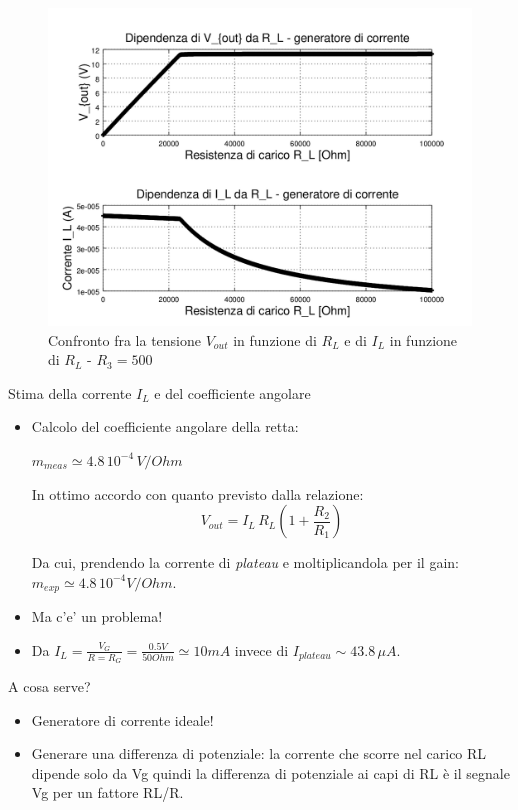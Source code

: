 \documentclass{beamer}
\begin{document}
\begin{frame}

{
\centering
\begin{figure}
\centering
\includegraphics[width=0.7\linewidth]{./Vout_R_L_R3_500_biplot}
\caption{Confronto fra la tensione $V_{out}$ in funzione di $R_L$ e di $I_L$ in funzione di $R_L$ - $R_3 = 500$}
\label{fig:Vout_R_L_R3_500_biplot}
\end{figure}

}
\end{frame}

\begin{frame}{Stima della corrente $I_L$ e del coefficiente angolare}

\begin{itemize}
\item Calcolo del coefficiente angolare della retta:

\begin{definition}
$m_{meas} \simeq 4.8 \, 10^{-4} \, \si{V/ Ohm}$
\end{definition}

In ottimo accordo con quanto previsto dalla relazione: \\


\begin{equation}
V_{out} = I_L \, R_L (1+ \frac{R_2}{R_1})
\end{equation}


Da cui, prendendo la corrente di \textit{plateau} e moltiplicandola per il gain: $ m_{exp} \simeq 4.8 \, 10^{-4} \si{V/ Ohm}$.

\item<2-> {
Ma c'e' un problema!
}

\item<3-> {
Da $I_L = \frac{V_G}{R = R_G} = \frac{0.5 \si{V}}{50 \si{Ohm}} \simeq 10 \si{mA}$ invece di $I_{plateau} \sim 43.8 \, \mu A $.
}

\end{itemize}

\end{frame}

\begin{frame}{A cosa serve?}

\begin{itemize}
\item Generatore di corrente ideale!

\item Generare una differenza di potenziale: la corrente che scorre nel carico RL dipende solo da Vg  quindi la differenza di potenziale ai capi di RL è il segnale Vg per un  fattore RL/R.
\end{itemize}

\end{frame}
\end{document}
